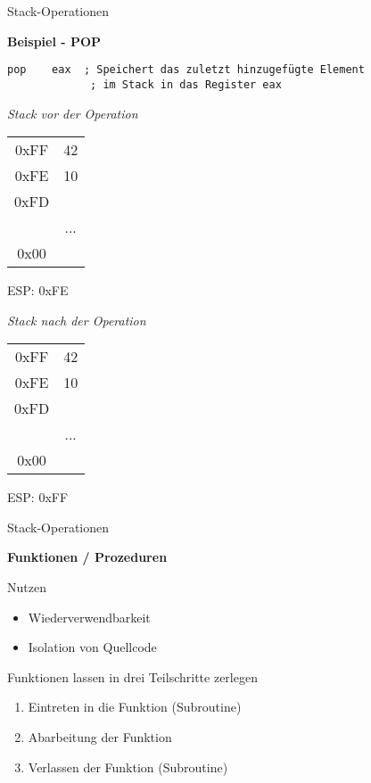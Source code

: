 \begin{frame}[fragile]{Stack-Operationen}

\begin{center}
\textbf{Beispiel - POP}
\end{center}

\begin{lstlisting}
pop    eax  ; Speichert das zuletzt hinzugefügte Element
             ; im Stack in das Register eax
\end{lstlisting}

\begin{multicols}{2}

\begin{minipage}{5cm}
\emph{Stack vor der Operation}
\begin{tabular}{c|c|}
    \cline{2-2}
   0xFF & 42\\ \cline{2-2}
   0xFE & 10\\ \cline{2-2}
   0xFD & \\ \cline{2-2}
        & ... \\ \cline{2-2}
     0x00 & \\ \cline{2-2}
\end{tabular}
ESP: 0xFE
\end{minipage}

\begin{minipage}{5cm}
\emph{Stack nach der Operation}
\begin{tabular}{c|c|}
    \cline{2-2}
   0xFF & 42\\ \cline{2-2}
   0xFE & 10\\ \cline{2-2}
   0xFD & \\ \cline{2-2}
          & ... \\ \cline{2-2}
     0x00 & \\ \cline{2-2}
\end{tabular}
ESP: 0xFF
\end{minipage}
\end{multicols}
\end{frame}


\begin{frame}[fragile]{Stack-Operationen}

\begin{center}
\textbf{Funktionen / Prozeduren}
\end{center}

Nutzen \begin{itemize}
    \item Wiederverwendbarkeit
    \item Isolation von Quellcode
\end{itemize}

\makebox{}

Funktionen lassen in drei Teilschritte zerlegen
\begin{enumerate}
    \item Eintreten in die Funktion (Subroutine)
    \item Abarbeitung der Funktion
    \item Verlassen der Funktion (Subroutine)
\end{enumerate}
\end{frame}

